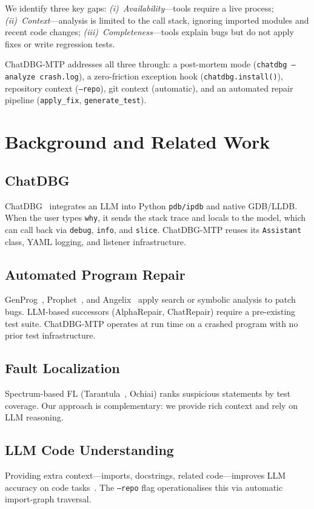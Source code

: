 \documentclass[conference]{IEEEtran}
\begin{document}
We identify three key gaps: \emph{(i)~Availability}---tools require a live
process; \emph{(ii)~Context}---analysis is limited to the call stack, ignoring
imported modules and recent code changes; \emph{(iii)~Completeness}---tools
explain bugs but do not apply fixes or write regression tests.

ChatDBG-MTP addresses all three through: a post-mortem mode
(\texttt{chatdbg --analyze crash.log}), a zero-friction exception hook
(\texttt{chatdbg.install()}), repository context (\texttt{--repo}), git context
(automatic), and an automated repair pipeline (\texttt{apply\_fix},
\texttt{generate\_test}).

\section{Background and Related Work}

\subsection{ChatDBG}
ChatDBG~\cite{chatdbg} integrates an LLM into Python \texttt{pdb/ipdb} and native
GDB/LLDB.  When the user types \texttt{why}, it sends the stack trace and locals
to the model, which can call back via \texttt{debug}, \texttt{info}, and
\texttt{slice}. ChatDBG-MTP reuses its \texttt{Assistant} class, YAML logging,
and listener infrastructure.

\subsection{Automated Program Repair}
GenProg~\cite{genprog}, Prophet~\cite{prophet}, and Angelix~\cite{angelix} apply
search or symbolic analysis to patch bugs. LLM-based successors (AlphaRepair,
ChatRepair) require a pre-existing test suite. ChatDBG-MTP operates at run time
on a crashed program with no prior test infrastructure.

\subsection{Fault Localization}
Spectrum-based FL (Tarantula~\cite{tarantula}, Ochiai) ranks suspicious
statements by test coverage. Our approach is complementary: we provide rich
context and rely on LLM reasoning.

\subsection{LLM Code Understanding}
Providing extra context---imports, docstrings, related code---improves
LLM accuracy on code tasks~\cite{codex,retrieval_prompts}. The \texttt{--repo}
flag operationalises this via automatic import-graph traversal.
\end{document}
